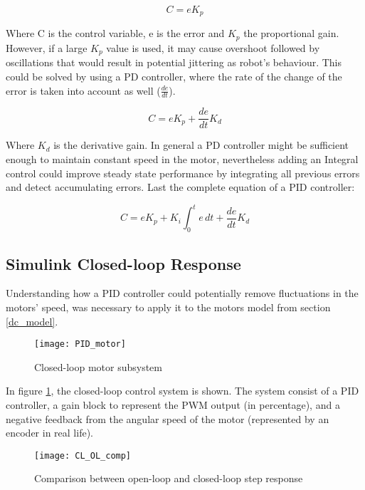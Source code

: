 \begin{equation}
C = eK_p 
\end{equation}

Where C is the control variable, e is the error and $K_p$ the proportional gain. 
However, if a large $K_p$ value is used, it may cause overshoot followed by oscillations that would result in potential jittering as robot's behaviour. This could be solved by using a PD controller, where the rate of the change of the error is taken into account as well ($\frac{de}{dt}$). 

\begin{equation}
C = eK_p + \frac{de}{dt}K_d
\end{equation}

Where $K_d$ is the derivative gain. 
In general a PD controller might be sufficient enough to maintain constant speed in the motor, nevertheless adding an Integral control could improve steady state performance by integrating all previous errors and detect accumulating errors. Last the complete equation of a PID controller:

\begin{equation}
C = eK_p + K_i\int_{0}^{t} e \,dt + \frac{de}{dt}K_d
\end{equation} 

\subsection{Simulink Closed-loop Response} 

Understanding how a PID controller could potentially remove fluctuations in the motors' speed, was necessary to apply it to the motors model from section \ref{dc_model}. 

\begin{figure}[h]
\centering
\texttt{[image: PID\_motor]}
\caption{Closed-loop motor subsystem}
\label{fig::PID_motor}
\end{figure}

In figure \ref{fig::PID_motor}, the closed-loop control system is shown. The system consist of a PID controller, a gain block to represent the PWM output (in percentage), and a negative feedback from the angular speed of the motor (represented by an encoder in real life). 

\begin{figure}[h]
\centering
\texttt{[image: CL\_OL\_comp]}
\caption{Comparison between open-loop and closed-loop step response}
\label{fig::PID_comp}
\end{figure}

